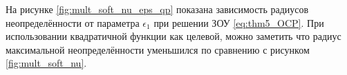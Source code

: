 На рисунке \ref{fig:mult_soft_nu_eps_qp} показана зависимость радиусов неопределённости от параметра $\epsilon_1$ при решении ЗОУ \eqref{eq:thm5_OCP}. При использовании квадратичной функции как целевой, можно заметить что радиус максимальной неопределённости уменьшился по сравнению с рисунком \ref{fig:mult_soft_nu}.

